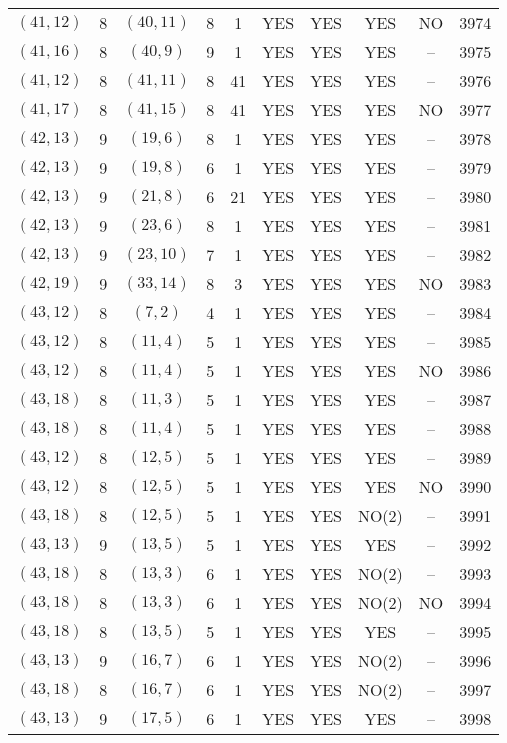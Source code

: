 \begin{longtable}{|c|c|c|c|c|c|c|c|c|c|}
$(41, 12)$ & 8 & $(40, 11)$ & 8 & 1 & YES & YES & YES & NO & 3974\\
$(41, 16)$ & 8 & $(40, 9)$ & 9 & 1 & YES & YES & YES & -- & 3975\\
$(41, 12)$ & 8 & $(41, 11)$ & 8 & 41 & YES & YES & YES & -- & 3976\\
$(41, 17)$ & 8 & $(41, 15)$ & 8 & 41 & YES & YES & YES & NO & 3977\\
$(42, 13)$ & 9 & $(19, 6)$ & 8 & 1 & YES & YES & YES & -- & 3978\\
$(42, 13)$ & 9 & $(19, 8)$ & 6 & 1 & YES & YES & YES & -- & 3979\\
$(42, 13)$ & 9 & $(21, 8)$ & 6 & 21 & YES & YES & YES & -- & 3980\\
$(42, 13)$ & 9 & $(23, 6)$ & 8 & 1 & YES & YES & YES & -- & 3981\\
$(42, 13)$ & 9 & $(23, 10)$ & 7 & 1 & YES & YES & YES & -- & 3982\\
$(42, 19)$ & 9 & $(33, 14)$ & 8 & 3 & YES & YES & YES & NO & 3983\\
$(43, 12)$ & 8 & $(7, 2)$ & 4 & 1 & YES & YES & YES & -- & 3984\\
$(43, 12)$ & 8 & $(11, 4)$ & 5 & 1 & YES & YES & YES & -- & 3985\\
$(43, 12)$ & 8 & $(11, 4)$ & 5 & 1 & YES & YES & YES & NO & 3986\\
$(43, 18)$ & 8 & $(11, 3)$ & 5 & 1 & YES & YES & YES & -- & 3987\\
$(43, 18)$ & 8 & $(11, 4)$ & 5 & 1 & YES & YES & YES & -- & 3988\\
$(43, 12)$ & 8 & $(12, 5)$ & 5 & 1 & YES & YES & YES & -- & 3989\\
$(43, 12)$ & 8 & $(12, 5)$ & 5 & 1 & YES & YES & YES & NO & 3990\\
$(43, 18)$ & 8 & $(12, 5)$ & 5 & 1 & YES & YES & NO(2) & -- & 3991\\
$(43, 13)$ & 9 & $(13, 5)$ & 5 & 1 & YES & YES & YES & -- & 3992\\
$(43, 18)$ & 8 & $(13, 3)$ & 6 & 1 & YES & YES & NO(2) & -- & 3993\\
$(43, 18)$ & 8 & $(13, 3)$ & 6 & 1 & YES & YES & NO(2) & NO & 3994\\
$(43, 18)$ & 8 & $(13, 5)$ & 5 & 1 & YES & YES & YES & -- & 3995\\
$(43, 13)$ & 9 & $(16, 7)$ & 6 & 1 & YES & YES & NO(2) & -- & 3996\\
$(43, 18)$ & 8 & $(16, 7)$ & 6 & 1 & YES & YES & NO(2) & -- & 3997\\
$(43, 13)$ & 9 & $(17, 5)$ & 6 & 1 & YES & YES & YES & -- & 3998\\

\end{longtable}
